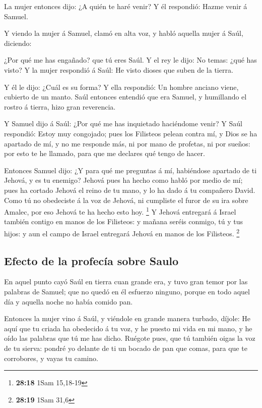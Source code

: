  La mujer entonces dijo: ¿A quién te haré venir? Y él
respondió: Hazme venir á Samuel.

 Y viendo la mujer á Samuel, clamó en alta voz, y habló
aquella mujer á Saúl, diciendo:

 ¿Por qué me has engañado? que tú eres Saúl. Y el rey le
dijo: No temas: ¿qué has visto? Y la mujer respondió á Saúl: He visto
dioses que suben de la tierra.

 Y él le dijo: ¿Cuál es su forma? Y ella respondió: Un
hombre anciano viene, cubierto de un manto. Saúl entonces entendió que
era Samuel, y humillando el rostro á tierra, hizo gran reverencia.

 Y Samuel dijo á Saúl: ¿Por qué me has inquietado
haciéndome venir? Y Saúl respondió: Estoy muy congojado; pues los
Filisteos pelean contra mí, y Dios se ha apartado de mí, y no me
responde más, ni por mano de profetas, ni por sueños: por esto te he
llamado, para que me declares qué tengo de hacer.

 Entonces Samuel dijo: ¿Y para qué me preguntas á mí,
habiéndose apartado de ti Jehová, y es tu enemigo? 
Jehová pues ha hecho como habló por medio de mí; pues ha cortado Jehová
el reino de tu mano, y lo ha dado á tu compañero David. 
Como tú no obedeciste á la voz de Jehová, ni cumpliste el furor de su
ira sobre Amalec, por eso Jehová te ha hecho esto hoy. \footnote{\textbf{28:18}
  1Sam 15,18-19}  Y Jehová entregará á Israel también
contigo en manos de los Filisteos: y mañana seréis conmigo, tú y tus
hijos: y aun el campo de Israel entregará Jehová en manos de los
Filisteos. \footnote{\textbf{28:19} 1Sam 31,6}

\hypertarget{efecto-de-la-profecuxeda-sobre-saulo}{%
\subsection{Efecto de la profecía sobre
Saulo}\label{efecto-de-la-profecuxeda-sobre-saulo}}

 En aquel punto cayó Saúl en tierra cuan grande era, y
tuvo gran temor por las palabras de Samuel; que no quedó en él esfuerzo
ninguno, porque en todo aquel día y aquella noche no había comido pan.

 Entonces la mujer vino á Saúl, y viéndole en grande
manera turbado, díjole: He aquí que tu criada ha obedecido á tu voz, y
he puesto mi vida en mi mano, y he oído las palabras que tú me has
dicho.  Ruégote pues, que tú también oigas la voz de tu
sierva: pondré yo delante de ti un bocado de pan que comas, para que te
corrobores, y vayas tu camino.

